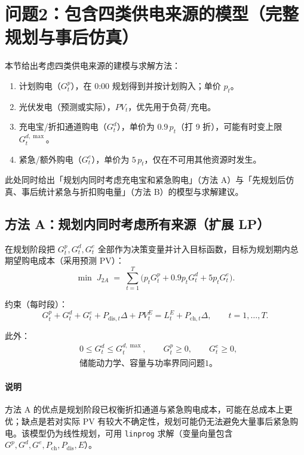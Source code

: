 \documentclass[12pt]{article}
\begin{document}
\section{问题2：包含四类供电来源的模型（完整规划与事后仿真）}
本节给出考虑四类供电来源的建模与求解方法：
\begin{enumerate}
  \item 计划购电（$G^p_t$），在 0:00 规划得到并按计划购入；单价 $p_t$。
  \item 光伏发电（预测或实际），$PV_t$，优先用于负荷/充电。
  \item 充电宝/折扣通道购电（$G^d_t$），单价为 $0.9\,p_t$（打 9 折），可能有时变上限 $G^{d,\max}_t$。
  \item 紧急/额外购电（$G^e_t$），单价为 $5\,p_t$，仅在不可用其他资源时发生。
\end{enumerate}

此处同时给出「规划内同时考虑充电宝和紧急购电」（方法 A）与「先规划后仿真、事后统计紧急与折扣购电量」（方法 B）的模型与求解建议。

\subsection{方法 A：规划内同时考虑所有来源（扩展 LP）}
在规划阶段把 $G^p_t,G^d_t,G^e_t$ 全部作为决策变量并计入目标函数，目标为规划期内总期望购电成本（采用预测 PV）：
\begin{equation}
\min\; J_{2A} \;=\; \sum_{t=1}^T \big( p_t G^p_t + 0.9p_t G^d_t + 5p_t G^e_t \big).
\label{eq:obj2A}
\end{equation}

约束（每时段）：
\begin{equation}
G^p_t + G^d_t + G^e_t + P_{\mathrm{dis},t}\Delta + PV_t^E = L_t^E + P_{\mathrm{ch},t}\Delta,\qquad t=1,\dots,T.
\label{eq:bal2A}
\end{equation}

此外：
\begin{align}
&0 \le G^d_t \le G^{d,\max}_t,\qquad G^p_t\ge0,\qquad G^e_t\ge0,\nonumber\\
&\text{储能动力学、容量与功率界同问题1。}
\end{align}

\paragraph{说明}
方法 A 的优点是规划阶段已权衡折扣通道与紧急购电成本，可能在总成本上更优；缺点是若对实际 PV 有较大不确定性，规划可能仍无法避免大量事后紧急购电。该模型仍为线性规划，可用 \texttt{linprog} 求解（变量向量包含 $G^p,G^d,G^e,P_{\mathrm{ch}},P_{\mathrm{dis}},E$）。
\end{document}
